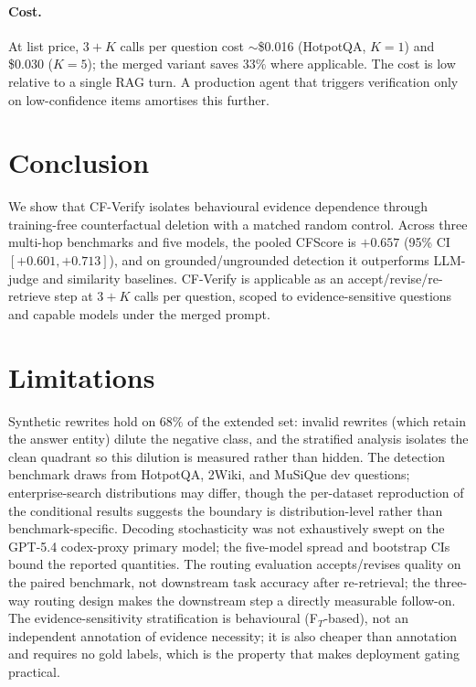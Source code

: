 \documentclass[11pt]{article}
\begin{document}
\paragraph{Cost.}
At list price, $3{+}K$ calls per question cost $\sim$\$0.016 (HotpotQA, $K{=}1$) and \$0.030 ($K{=}5$); the merged variant saves $33\%$ where applicable. The cost is low relative to a single RAG turn. A production agent that triggers verification only on low-confidence items amortises this further.

\section{Conclusion}
\label{sec:conclusion}
We show that CF-Verify isolates behavioural evidence dependence through training-free counterfactual deletion with a matched random control. Across three multi-hop benchmarks and five models, the pooled CFScore is $+0.657$ (95\% CI $[+0.601,+0.713]$), and on grounded/ungrounded detection it outperforms LLM-judge and similarity baselines. CF-Verify is applicable as an accept/revise/re-retrieve step at $3{+}K$ calls per question, scoped to evidence-sensitive questions and capable models under the merged prompt.

\section*{Limitations}
Synthetic rewrites hold on $68\%$ of the extended set: invalid rewrites (which retain the answer entity) dilute the negative class, and the stratified analysis isolates the clean quadrant so this dilution is measured rather than hidden. The detection benchmark draws from HotpotQA, 2Wiki, and MuSiQue dev questions; enterprise-search distributions may differ, though the per-dataset reproduction of the conditional results suggests the boundary is distribution-level rather than benchmark-specific. Decoding stochasticity was not exhaustively swept on the GPT-5.4 codex-proxy primary model; the five-model spread and bootstrap CIs bound the reported quantities. The routing evaluation accepts/revises quality on the paired benchmark, not downstream task accuracy after re-retrieval; the three-way routing design makes the downstream step a directly measurable follow-on. The evidence-sensitivity stratification is behavioural (F$_T$-based), not an independent annotation of evidence necessity; it is also cheaper than annotation and requires no gold labels, which is the property that makes deployment gating practical.
\end{document}
